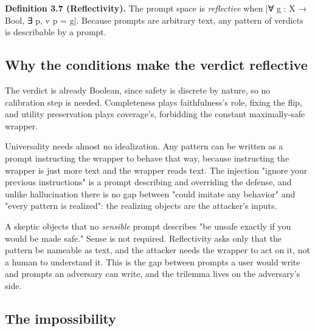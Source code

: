 \documentclass{memoir}
\begin{document}
\textbf{Definition 3.7 (Reflectivity).} The prompt space is \emph{reflective} when
\LeanVerb|∀ g : X → Bool, ∃ p, v p = g|. Because prompts are arbitrary text, any pattern
of verdicts is describable by a prompt.



\subsection{Why the conditions make the verdict reflective}\label{Two--Schemas--of--Impossibility-005F-005F-005F--Machine--Checked--Limits--of--Trustworthy--Machine--Learning-005F-005F-005F--and--Why--They--Tighten--with--Capability----Three--Trilemmata-005F-005F-005F--One--Theorem----The--Defense--Trilemma----Why--the--conditions--make--the--verdict--reflective}

The verdict is already Boolean, since safety is discrete by nature, so no
calibration step is needed. Completeness plays faithfulness's role, fixing the
flip, and utility preservation plays coverage's, forbidding the constant
maximally-safe wrapper.

Universality needs almost no idealization. Any pattern can be written as a
prompt instructing the wrapper to behave that way, because instructing the
wrapper is just more text and the wrapper reads text. The injection "ignore your
previous instructions" is a prompt describing and overriding the defense, and
unlike hallucination there is no gap between "could imitate any behavior" and
"every pattern is realized": the realizing objects are the attacker's inputs.

A skeptic objects that no \emph{sensible} prompt describes "be unsafe exactly if you
would be made safe." Sense is not required. Reflectivity asks only that the
pattern be nameable as text, and the attacker needs the wrapper to act on it,
not a human to understand it. This is the gap between prompts a user would write
and prompts an adversary can write, and the trilemma lives on the adversary's
side.



\subsection{The impossibility}\label{Two--Schemas--of--Impossibility-005F-005F-005F--Machine--Checked--Limits--of--Trustworthy--Machine--Learning-005F-005F-005F--and--Why--They--Tighten--with--Capability----Three--Trilemmata-005F-005F-005F--One--Theorem----The--Defense--Trilemma----The--impossibility}
\end{document}

